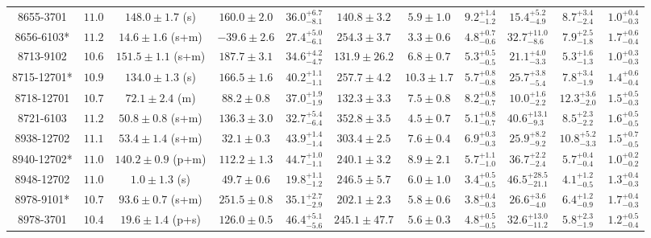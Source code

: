 \begin{landscape}
\begin{longtable}{ccccccccccc}
8655-3701 & $11.0$  & $148.0 \pm 1.7$ (s)  & $160.0 \pm 2.0$ & $36.0^{+6.7}_{-8.1}$  & $140.8 \pm 3.2 $ & $5.9 \pm 1.0 $ & $9.2^{+1.4}_{-1.2}$  & $15.4^{+5.2}_{-4.9}$  & $8.7^{+3.4}_{-2.4}$  & $1.0^{+0.4}_{-0.3}$ \\ 
8656-6103* & $11.2$  & $14.6 \pm 1.6$ (s+m)  & $-39.6 \pm 2.6$ & $27.4^{+5.0}_{-6.1}$  & $254.3 \pm 3.7 $ & $3.3 \pm 0.6 $ & $4.8^{+0.7}_{-0.6}$  & $32.7^{+11.0}_{-8.6}$  & $7.9^{+2.5}_{-1.8}$  & $1.7^{+0.6}_{-0.4}$ \\ 
8713-9102 & $10.6$  & $151.5 \pm 1.1$ (s+m)  & $187.7 \pm 3.1$ & $34.6^{+4.2}_{-4.7}$  & $131.9 \pm 26.2 $ & $6.8 \pm 0.7 $ & $5.3^{+0.5}_{-0.5}$  & $21.1^{+4.0}_{-3.3}$  & $5.3^{+1.6}_{-1.3}$  & $1.0^{+0.3}_{-0.3}$ \\ 
8715-12701* & $10.9$  & $134.0 \pm 1.3$ (s)  & $166.5 \pm 1.6$ & $40.2^{+1.1}_{-1.1}$  & $257.7 \pm 4.2 $ & $10.3 \pm 1.7 $ & $5.7^{+0.8}_{-0.8}$  & $25.7^{+3.8}_{-5.4}$  & $7.8^{+3.4}_{-1.9}$  & $1.4^{+0.6}_{-0.4}$ \\ 
8718-12701 & $10.7$  & $72.1 \pm 2.4$ (m)  & $88.2 \pm 0.8$ & $37.0^{+1.9}_{-1.9}$  & $132.3 \pm 3.3 $ & $7.5 \pm 0.8 $ & $8.2^{+0.8}_{-0.7}$  & $10.0^{+1.6}_{-2.2}$  & $12.3^{+3.6}_{-2.0}$  & $1.5^{+0.5}_{-0.3}$ \\ 
8721-6103 & $11.2$  & $50.8 \pm 0.8$ (s+m)  & $136.3 \pm 3.0$ & $32.7^{+5.4}_{-6.4}$  & $352.8 \pm 3.5 $ & $4.5 \pm 0.7 $ & $5.1^{+0.8}_{-0.7}$  & $40.6^{+13.1}_{-9.3}$  & $8.5^{+2.3}_{-2.2}$  & $1.6^{+0.5}_{-0.5}$ \\ 
8938-12702 & $11.1$  & $53.4 \pm 1.4$ (s+m)  & $32.1 \pm 0.3$ & $43.9^{+1.4}_{-1.4}$  & $303.4 \pm 2.5 $ & $7.6 \pm 0.4 $ & $6.9^{+0.3}_{-0.3}$  & $25.9^{+8.2}_{-9.2}$  & $10.8^{+5.2}_{-3.3}$  & $1.5^{+0.7}_{-0.5}$ \\ 
8940-12702* & $11.0$  & $140.2 \pm 0.9$ (p+m)  & $112.2 \pm 1.3$ & $44.7^{+1.0}_{-1.1}$  & $240.1 \pm 3.2 $ & $8.9 \pm 2.1 $ & $5.7^{+1.1}_{-1.0}$  & $36.7^{+2.2}_{-2.4}$  & $5.7^{+0.4}_{-0.4}$  & $1.0^{+0.2}_{-0.2}$ \\ 
8948-12702 & $11.0$  & $1.0 \pm 1.3$ (s)  & $49.7 \pm 0.6$ & $19.8^{+1.1}_{-1.2}$  & $246.5 \pm 5.7 $ & $6.0 \pm 1.0 $ & $3.4^{+0.5}_{-0.5}$  & $46.5^{+28.5}_{-21.1}$  & $4.1^{+1.2}_{-0.5}$  & $1.3^{+0.4}_{-0.3}$ \\ 
8978-9101* & $10.7$  & $93.6 \pm 0.7$ (s+m)  & $251.5 \pm 0.8$ & $35.1^{+2.7}_{-2.9}$  & $202.1 \pm 2.3 $ & $5.8 \pm 0.6 $ & $3.8^{+0.4}_{-0.3}$  & $26.6^{+3.6}_{-4.0}$  & $6.4^{+1.2}_{-0.9}$  & $1.7^{+0.4}_{-0.3}$ \\ 
8978-3701 & $10.4$  & $19.6 \pm 1.4$ (p+s)  & $126.0 \pm 0.5$ & $46.4^{+5.1}_{-5.6}$  & $245.1 \pm 47.7 $ & $5.6 \pm 0.3 $ & $4.8^{+0.5}_{-0.5}$  & $32.6^{+13.0}_{-11.2}$  & $5.8^{+2.3}_{-1.9}$  & $1.2^{+0.5}_{-0.4}$ \\ 

\end{longtable}
\end{landscape}
